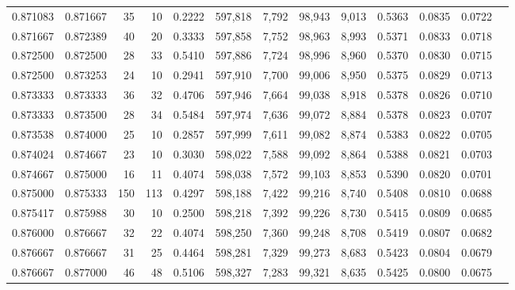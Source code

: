 \begin{tabular}{rrrrrrrrrrrrr}
0.871083 & 0.871667 &    35 &  10 &                                     0.2222 & 597,818 &   7,792 &  98,943 &   9,013 & 0.5363 & 0.0835 & 0.0722 \\
0.871667 & 0.872389 &    40 &  20 &                                     0.3333 & 597,858 &   7,752 &  98,963 &   8,993 & 0.5371 & 0.0833 & 0.0718 \\
0.872500 & 0.872500 &    28 &  33 &                                     0.5410 & 597,886 &   7,724 &  98,996 &   8,960 & 0.5370 & 0.0830 & 0.0715 \\
0.872500 & 0.873253 &    24 &  10 &                                     0.2941 & 597,910 &   7,700 &  99,006 &   8,950 & 0.5375 & 0.0829 & 0.0713 \\
0.873333 & 0.873333 &    36 &  32 &                                     0.4706 & 597,946 &   7,664 &  99,038 &   8,918 & 0.5378 & 0.0826 & 0.0710 \\
0.873333 & 0.873500 &    28 &  34 &                                     0.5484 & 597,974 &   7,636 &  99,072 &   8,884 & 0.5378 & 0.0823 & 0.0707 \\
0.873538 & 0.874000 &    25 &  10 &                                     0.2857 & 597,999 &   7,611 &  99,082 &   8,874 & 0.5383 & 0.0822 & 0.0705 \\
0.874024 & 0.874667 &    23 &  10 &                                     0.3030 & 598,022 &   7,588 &  99,092 &   8,864 & 0.5388 & 0.0821 & 0.0703 \\
0.874667 & 0.875000 &    16 &  11 &                                     0.4074 & 598,038 &   7,572 &  99,103 &   8,853 & 0.5390 & 0.0820 & 0.0701 \\
0.875000 & 0.875333 &   150 & 113 &                                     0.4297 & 598,188 &   7,422 &  99,216 &   8,740 & 0.5408 & 0.0810 & 0.0688 \\
0.875417 & 0.875988 &    30 &  10 &                                     0.2500 & 598,218 &   7,392 &  99,226 &   8,730 & 0.5415 & 0.0809 & 0.0685 \\
0.876000 & 0.876667 &    32 &  22 &                                     0.4074 & 598,250 &   7,360 &  99,248 &   8,708 & 0.5419 & 0.0807 & 0.0682 \\
0.876667 & 0.876667 &    31 &  25 &                                     0.4464 & 598,281 &   7,329 &  99,273 &   8,683 & 0.5423 & 0.0804 & 0.0679 \\
0.876667 & 0.877000 &    46 &  48 &                                     0.5106 & 598,327 &   7,283 &  99,321 &   8,635 & 0.5425 & 0.0800 & 0.0675 \\

\end{tabular}
